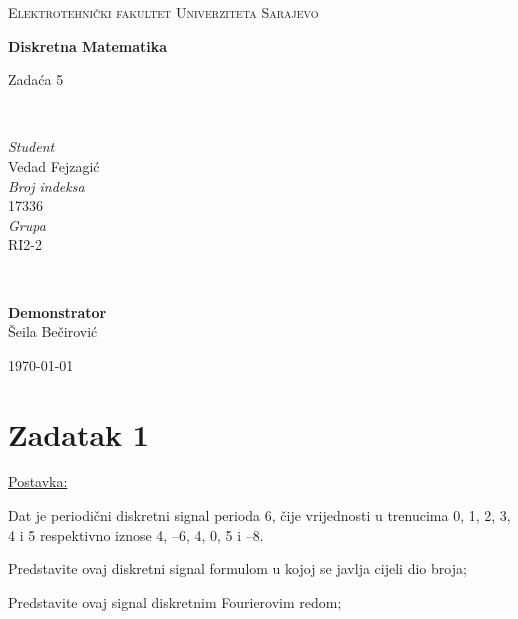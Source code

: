 \documentclass[12pt]{article}
\begin{document}
\begin{titlepage}
	\newcommand{\HRule}{\rule{\linewidth}{0.5mm}}
	
	\center
	
	\textsc{\Large Elektrotehnički fakultet Univerziteta Sarajevo}\\[4cm]
	
	{\huge\bfseries Diskretna Matematika\vspace{5mm}

 	Zadaća 5}\\[4.5cm]

	\begin{minipage}{0.4\textwidth}
		\begin{flushleft}
			\large
			\textit{Student}\\
			Vedad Fejzagić\\[5mm]
			\textit{Broj indeksa}\\
			17336\\[5mm]
			\textit{Grupa}\\
			RI2-2
		\end{flushleft}
	\end{minipage}
	~
	\begin{minipage}{0.4\textwidth}
		\begin{flushright}
			\large
			\textbf{Demonstrator}\\
			\hspace{10mm}Šeila Bečirović
		\end{flushright}
	\end{minipage}
	
	\vfill\vfill\vfill
	
	{\large\today}
	
	\vfill
	
\end{titlepage}

\newpage

\section*{Zadatak 1\label{Z1}}

\underline{Postavka:}

Dat je periodični diskretni signal perioda 6, čije vrijednosti u trenucima 0, 1, 2, 3, 4 i 5 respektivno iznose 4, –6, 4, 0, 5 i –8.


Predstavite ovaj diskretni signal formulom u kojoj se javlja cijeli dio broja;

Predstavite ovaj signal diskretnim Fourierovim redom;
\end{document}
